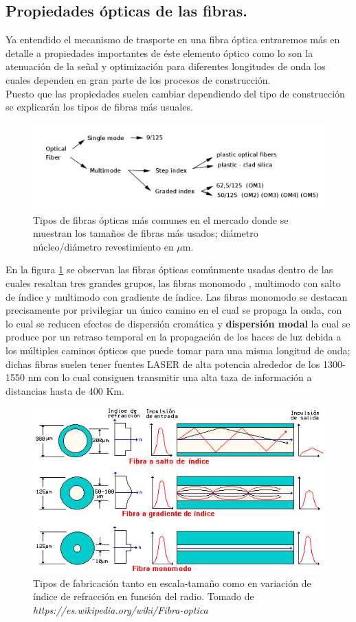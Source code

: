 
\subsection{Propiedades ópticas de las fibras.}
Ya entendido el mecanismo de trasporte en una fibra óptica entraremos más en detalle a propiedades importantes de éste elemento óptico como lo son la atenuación de la señal y optimización para diferentes longitudes de onda los cuales dependen en gran parte de los procesos de construcción.\\
Puesto que las propiedades suelen cambiar dependiendo del tipo de construcción se explicarán los tipos de fibras más usuales.

\begin{figure}[H]
\centering
\includegraphics[width=0.76\linewidth]{Kap1/tipos_fibras.png}
\caption{Tipos de fibras ópticas más comunes en el mercado donde se muestran los tamaños de fibras más usados; diámetro núcleo/diámetro revestimiento en $\mu$m.} 
\label{tipos_fibras}
\end{figure}

En la figura \ref{tipos_fibras} se observan las fibras ópticas comúnmente usadas dentro de las cuales resaltan tres grandes grupos, las fibras monomodo , multimodo con salto de índice y multimodo con gradiente de índice. Las fibras monomodo se destacan precisamente por privilegiar un único camino en el cual se propaga la onda, con lo cual se reducen efectos de dispersión cromática y \textbf{dispersión modal} la cual se produce por un retraso temporal en la propagación de los haces de luz debida a los múltiples caminos ópticos que puede tomar para una misma longitud de onda; dichas fibras suelen tener fuentes LASER de alta potencia alrededor de los 1300-1550 nm con lo cual consiguen transmitir una alta taza de información a distancias hasta de 400 Km.

\begin{figure}[H]
\centering
\includegraphics[width=0.66\linewidth]{Kap1/fibras3.jpg}
\caption{Tipos de fabricación tanto en escala-tamaño como en variación de índice de refracción en función del radio. Tomado de \textit{https://es.wikipedia.org/wiki/Fibra-optica}} 
\label{fibras3}
\end{figure} 


